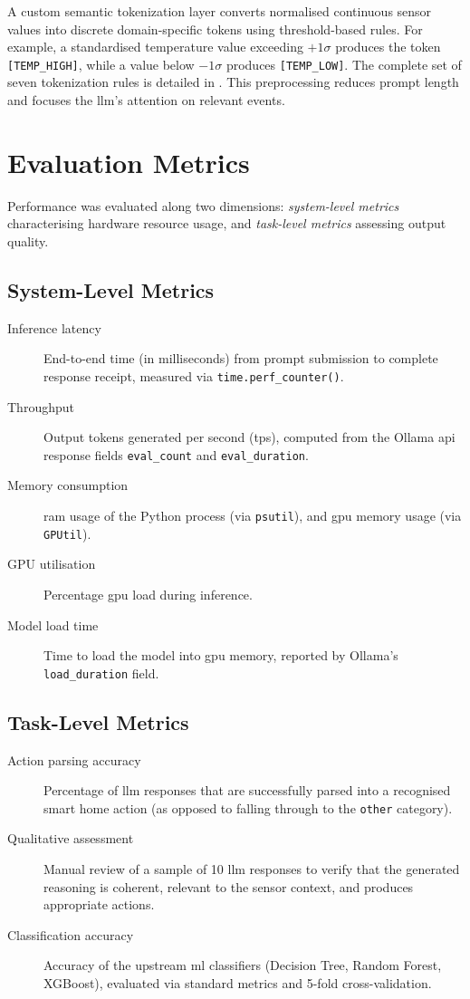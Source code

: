 \documentclass[12pt,a4paper,oneside]{report}
\begin{document}
A custom semantic tokenization layer converts normalised continuous sensor values into discrete domain-specific tokens using threshold-based rules. For example, a standardised temperature value exceeding $+1\sigma$ produces the token \texttt{[TEMP\_HIGH]}, while a value below $-1\sigma$ produces \texttt{[TEMP\_LOW]}. The complete set of seven tokenization rules is detailed in . This preprocessing reduces prompt length and focuses the \gls{llm}'s attention on relevant events.


\section{Evaluation Metrics}
\label{sec:meth-metrics}

Performance was evaluated along two dimensions: \textit{system-level metrics} characterising hardware resource usage, and \textit{task-level metrics} assessing output quality.

\subsection{System-Level Metrics}

\begin{description}
    \item[Inference latency] End-to-end time (in milliseconds) from prompt submission to complete response receipt, measured via \texttt{time.perf\_counter()}.
    \item[Throughput] Output tokens generated per second (\gls{tps}), computed from the Ollama \gls{api} response fields \texttt{eval\_count} and \texttt{eval\_duration}.
    \item[Memory consumption] \gls{ram} usage of the Python process (via \texttt{psutil}), and \gls{gpu} memory usage (via \texttt{GPUtil}).
    \item[GPU utilisation] Percentage \gls{gpu} load during inference.
    \item[Model load time] Time to load the model into \gls{gpu} memory, reported by Ollama's \texttt{load\_duration} field.
\end{description}

\subsection{Task-Level Metrics}

\begin{description}
    \item[Action parsing accuracy] Percentage of \gls{llm} responses that are successfully parsed into a recognised smart home action (as opposed to falling through to the \texttt{other} category).
    \item[Qualitative assessment] Manual review of a sample of 10 \gls{llm} responses to verify that the generated reasoning is coherent, relevant to the sensor context, and produces appropriate actions.
    \item[Classification accuracy] Accuracy of the upstream \gls{ml} classifiers (Decision Tree, Random Forest, XGBoost), evaluated via standard metrics and 5-fold cross-validation.
\end{description}
\end{document}
